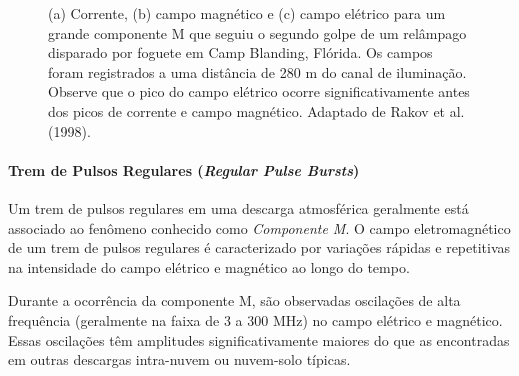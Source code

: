 \documentclass[a4paper, 12pt, onecolumn,singlespacing]{article}
\begin{document}
			\begin{figure}[!htb]
				\caption{(a) Corrente, (b) campo magnético e (c) campo elétrico para um grande componente M que seguiu o segundo golpe de um relâmpago disparado por foguete em Camp Blanding, Flórida. Os campos foram registrados a uma distância de 280 m do canal de iluminação. Observe que o pico do campo elétrico ocorre significativamente antes dos picos de corrente e campo magnético. Adaptado de Rakov et al. (1998).}
				\label{componente_m}
				 \hfill
			\end{figure}
		\paragraph{Trem de Pulsos Regulares (\textit{Regular Pulse Bursts})}
		
		Um trem de pulsos regulares em uma descarga atmosférica geralmente está associado ao fenômeno conhecido como \textit{Componente M}. O campo eletromagnético de um trem de pulsos regulares é caracterizado por variações rápidas e repetitivas na intensidade do campo elétrico e magnético ao longo do tempo.
		
		Durante a ocorrência da componente M, são observadas oscilações de alta frequência (geralmente na faixa de 3 a 300 MHz) no campo elétrico e magnético. Essas oscilações têm amplitudes significativamente maiores do que as encontradas em outras descargas intra-nuvem ou nuvem-solo típicas.
		
\end{document}
